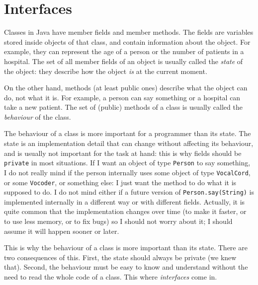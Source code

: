 %    
% 
%

\section{Interfaces}
\label{sec:interfaces}

Classes in Java have member fields and member methods. The fields are
variables stored inside objects of that class, and contain
information about the object. For example, they can represent the age
of a person or the number of patients in a hospital. The set of all
member fields of an object is usually called the \emph{state} of the
object: they describe how the object \emph{is} at the current moment. 

On the other hand, methods (at least public ones) describe what the
object can do, not what it is. 
For example, a person can say something or a hospital can take
a new patient. The set of (public) methods of a class is usually
called the \emph{behaviour} of the class. 

The behaviour of a class is more important for a programmer than its
state. The state is an implementation detail that can change without
affecting its behaviour, and is usually not important for the task at
hand: this is why fields should be \verb+private+ in most
situations. If I want an object of type \verb+Person+ to say
something, I do not really mind if the person internally uses some
object of type \verb+VocalCord+, or some \verb+Vocoder+, or something
else: I just want the method to do what it is supposed to do. I do not
mind either if a future version of \verb+Person.say(String)+ is
implemented internally in a different way or with different
fields. Actually, it is quite common that the implementation changes
over time (to make it faster, or to use less memory, or to fix bugs)
so I should not worry about it; I should assume it will happen sooner
or later. 

This is why the behaviour of a class is more important than its
state. There are two consequences of this. First, the state should
always be private (we knew that). 
Second, the behaviour must be easy to know and
understand without the need to read the whole code of a class. This
where \emph{interfaces} come in. 


